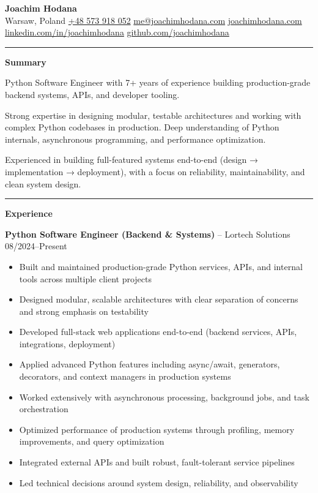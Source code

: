 \documentclass[11pt,a4paper]{article}
\begin{document}
{\LARGE \textbf{Joachim Hodana}} \\

Warsaw, Poland \quad
\href{tel:+48573918052}{+48 573 918 052} \quad
\href{mailto:me@joachimhodana.com}{me@joachimhodana.com} \quad
\href{https://joachimhodana.com}{joachimhodana.com} \\
\href{https://linkedin.com/in/joachimhodana}{linkedin.com/in/joachimhodana} \quad
\href{https://github.com/joachimhodana}{github.com/joachimhodana}

\rule{\textwidth}{0.5pt}

\textbf{Summary}

Python Software Engineer with 7+ years of experience building production-grade backend systems, APIs, and developer tooling.

Strong expertise in designing modular, testable architectures and working with complex Python codebases in production. Deep understanding of Python internals, asynchronous programming, and performance optimization.

Experienced in building full-featured systems end-to-end (design → implementation → deployment), with a focus on reliability, maintainability, and clean system design.

\rule{\textwidth}{0.5pt}

\textbf{Experience}

\textbf{Python Software Engineer (Backend \& Systems)} -- Lortech Solutions \hfill 08/2024--Present
\begin{itemize}
\item Built and maintained production-grade Python services, APIs, and internal tools across multiple client projects
\item Designed modular, scalable architectures with clear separation of concerns and strong emphasis on testability
\item Developed full-stack web applications end-to-end (backend services, APIs, integrations, deployment)
\item Applied advanced Python features including async/await, generators, decorators, and context managers in production systems
\item Worked extensively with asynchronous processing, background jobs, and task orchestration
\item Optimized performance of production systems through profiling, memory improvements, and query optimization
\item Integrated external APIs and built robust, fault-tolerant service pipelines
\item Led technical decisions around system design, reliability, and observability
\end{itemize}
\end{document}
